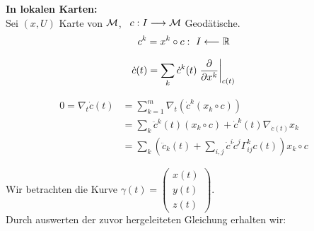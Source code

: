 \textbf{In lokalen Karten:} \\
Sei $(x,U)$ Karte von $\mathcal{M}$, \ $c: I \longrightarrow \mathcal{M}$ Geodätische. 
\begin{align}
c^k = x^k \circ c: \ I \longleftarrow \mathbb{R}
\end{align}

\begin{align}
\dot{c}(t) = \sum_k \dot{c}^k(t) \eval{\frac{\partial}{\partial x^k}}_{c(t)}
\end{align}

\begin{align*}
0=\nabla_t\dot{c}(t) &= \sum_{k=1}^{m}\nabla_t(\dot{c}^k(x_k\circ c)) \\
							   &= \sum_k \ddot{c}^k(t)(x_k\circ c) + \dot{c}^k(t)\nabla_{\dot{c}(t)}x_k \\
							   &= \sum_k \left(\ddot{c}_k(t) + \sum_{i,j}\dot{c}^{i}\dot{c}^j \Gamma_{ij}^k c(t)\right) x_k \circ c
\end{align*}

Wir betrachten die Kurve $\gamma(t)= \begin{pmatrix}
x(t) \\ y(t) \\z(t) \end{pmatrix}$. \\

Durch auswerten der zuvor hergeleiteten Gleichung erhalten wir:



